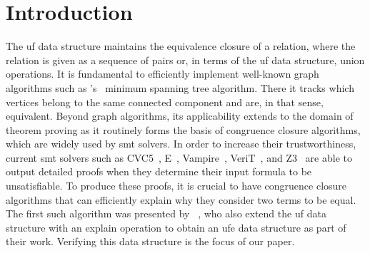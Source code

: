 \documentclass[
  sigplan,
  10pt,
  anonymous,
  review,
  ]{acmart}
\newcommand{\opunion}{union}
\newcommand{\opexplain}{explain}
\begin{document}
\section{Introduction}
The \acrfull{uf} data structure maintains the equivalence closure of a relation, where the relation is given as a sequence of pairs or, in terms of the \acrshort{uf} data structure, \opunion{} operations.
It is fundamental to efficiently implement well-known graph algorithms such as \citeauthor{mst}'s~\cite{mst} minimum spanning tree algorithm. 
There it tracks which vertices belong to the same connected component and are, in that sense, equivalent.
Beyond graph algorithms, its applicability extends to the domain of theorem proving as it routinely forms the basis of congruence closure algorithms, which are widely used by \acrfull{smt} solvers.
In order to increase their trustworthiness, current \acrshort{smt} solvers such as CVC5~\cite{cvc5}, E~\cite{eprover}, Vampire~\cite{vampire}, VeriT~\cite{verit}, and Z3~\cite{z3_proofs} are able to output detailed proofs when they determine their input formula to be unsatisfiable.
To produce these proofs, it is crucial to have congruence closure algorithms that can efficiently explain why they consider two terms to be equal.
The first such algorithm was presented by \citeauthor{congcl_proofs}~\cite{congcl_proofs,congcl_fast_extensions}, 
who also extend the \acrshort{uf} data structure with an \opexplain{} operation to obtain an \acrfull{ufe} data structure as part of their work.
Verifying this data structure is the focus of our paper.
\end{document}
